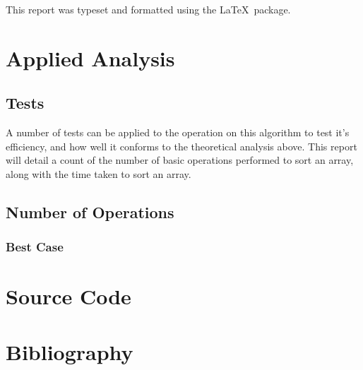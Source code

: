 \documentclass{article}
\begin{document}
    This report was typeset and formatted using the \LaTeX\  package.

\section{Applied Analysis}

    \subsection{Tests}
        A number of tests can be applied to the operation on this algorithm to test it's efficiency, and how well it conforms to the theoretical analysis above. This report will detail a count of the number of basic operations performed to sort an array, along with the time taken to sort an array.
    \subsection{Number of Operations}

        \subsubsection{Best Case}

    \section{Source Code}
    

\section{Bibliography}
    
\end{document}
